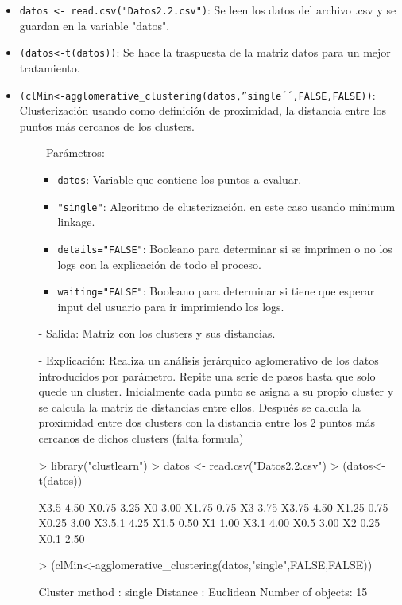 \documentclass[a4paper, 12pt]{article}
\begin{document}
	\begin{itemize}
		\item \texttt{datos <- read.csv("Datos2.2.csv")}: Se leen los datos del archivo .csv y se guardan en la variable "datos".
		\item \texttt{(datos<-t(datos))}: Se hace la traspuesta de la matriz datos para un mejor tratamiento.
		\item \texttt{(clMin<-agglomerative\_clustering(datos,''single´´,FALSE,FALSE))}: Clusterización usando como definición de proximidad, la distancia entre los puntos más cercanos de los clusters.
		\begin{itemize}
			\item [-] Parámetros:
			\begin{itemize}
				\item \texttt{datos}: Variable que contiene los puntos a evaluar.
				\item \texttt{"single"}: Algoritmo de clusterización, en este caso usando minimum linkage.
				\item \texttt{details="FALSE"}: Booleano para determinar si se imprimen o no los logs con la explicación de todo el proceso.
				\item \texttt{waiting="FALSE"}: Booleano para determinar si tiene que esperar input del usuario para ir imprimiendo los logs.
			\end{itemize}
			\item [-] Salida: Matriz con los clusters y sus distancias.
			\item [-] Explicación: Realiza un análisis jerárquico aglomerativo de los datos introducidos por parámetro. Repite una serie de pasos hasta que solo quede un cluster. Inicialmente cada punto se asigna a su propio cluster y se calcula la matriz de distancias entre ellos. Después se calcula la proximidad entre dos clusters con la distancia entre los 2 puntos más cercanos de dichos clusters (falta formula)
\begin{Schunk}
\begin{Sinput}
> library("clustlearn")
> datos <- read.csv("Datos2.2.csv")
> (datos<-t(datos))
\end{Sinput}
\begin{Soutput}
       [,1]
X3.5   4.50
X0.75  3.25
X0     3.00
X1.75  0.75
X3     3.75
X3.75  4.50
X1.25  0.75
X0.25  3.00
X3.5.1 4.25
X1.5   0.50
X1     1.00
X3.1   4.00
X0.5   3.00
X2     0.25
X0.1   2.50
\end{Soutput}
\begin{Sinput}
> (clMin<-agglomerative_clustering(datos,"single",FALSE,FALSE))
\end{Sinput}
\begin{Soutput}
Cluster method   : single 
Distance         : Euclidean 
Number of objects: 15 
\end{Soutput}
\end{Schunk}
		\end{itemize}
		

\end{itemize}
\end{document}
